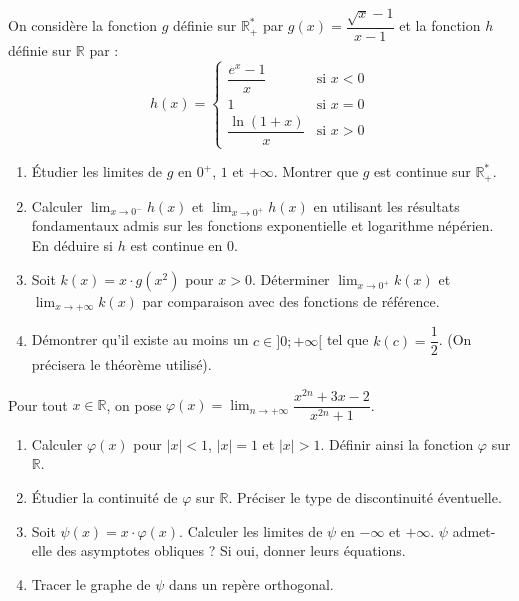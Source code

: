 \documentclass[11pt]{article}
\begin{document}
\begin{exercice}
On considère la fonction $g$ définie sur $\mathbb{R}^*_+$ par $g(x) = \dfrac{\sqrt{x} - 1}{x - 1}$ et la fonction $h$ définie sur $\mathbb{R}$ par :
\[
h(x) = \begin{cases}
\dfrac{e^x - 1}{x} & \text{si } x < 0 \\[1em]
1 & \text{si } x = 0 \\[0.5em]
\dfrac{\ln(1+x)}{x} & \text{si } x > 0
\end{cases}
\]
\begin{enumerate}
    \item Étudier les limites de $g$ en $0^+$, $1$ et $+\infty$. Montrer que $g$ est continue sur $\mathbb{R}^*_+$.
    \item Calculer $\lim_{x \to 0^-} h(x)$ et $\lim_{x \to 0^+} h(x)$ en utilisant les résultats fondamentaux admis sur les fonctions exponentielle et logarithme népérien. En déduire si $h$ est continue en $0$.
    \item Soit $k(x) = x \cdot g(x^2)$ pour $x > 0$. Déterminer $\lim_{x \to 0^+} k(x)$ et $\lim_{x \to +\infty} k(x)$ par comparaison avec des fonctions de référence.
    \item Démontrer qu'il existe au moins un $c \in ]0; +\infty[$ tel que $k(c) = \dfrac{1}{2}$. (On précisera le théorème utilisé).
\end{enumerate}
\end{exercice}

\begin{exercice}
Pour tout $x \in \mathbb{R}$, on pose $\varphi(x) = \lim_{n \to +\infty} \dfrac{x^{2n} + 3x - 2}{x^{2n} + 1}$.
\begin{enumerate}
    \item Calculer $\varphi(x)$ pour $|x| < 1$, $|x| = 1$ et $|x| > 1$. Définir ainsi la fonction $\varphi$ sur $\mathbb{R}$.
    \item Étudier la continuité de $\varphi$ sur $\mathbb{R}$. Préciser le type de discontinuité éventuelle.
    \item Soit $\psi(x) = x \cdot \varphi(x)$. Calculer les limites de $\psi$ en $-\infty$ et $+\infty$. $\psi$ admet-elle des asymptotes obliques ? Si oui, donner leurs équations.
    \item Tracer le graphe de $\psi$ dans un repère orthogonal.
\end{enumerate}
\end{exercice}
\end{document}
